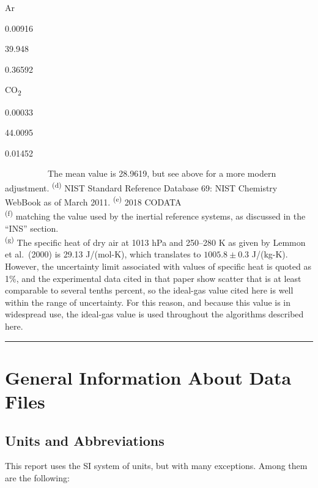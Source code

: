 \documentclass[
]{book}
\begin{document}
Ar

0.00916

39.948

0.36592

CO\textsubscript{2}

0.00033

44.0095

0.01452

~~~~~~~~~~The mean value is 28.9619, but see above for a more modern adjustment.
\textsuperscript{(d)} NIST Standard Reference Database 69: NIST Chemistry WebBook as of
March 2011.
\textsuperscript{(e)} 2018 CODATA\\
\textsuperscript{(f)} matching the value used by the inertial reference systems, as discussed
in the ``INS'' section.\\
\textsuperscript{(g)} The specific heat of dry air at 1013 hPa and 250--280 K as given
by Lemmon et al.~(2000) is 29.13 J/(mol-K), which translates to \(1005.8\pm 0.3\)
J/(kg-K). However, the uncertainty limit associated with values of
specific heat is quoted as 1\%, and the experimental data cited in
that paper show scatter that is at least comparable to several tenths
percent, so the ideal-gas value cited here is well within the range
of uncertainty. For this reason, and because this value is in widespread
use, the ideal-gas value is used throughout the algorithms described
here.

\begin{center}\rule{0.5\linewidth}{0.5pt}\end{center}

\hypertarget{general-information-about-data-files}{%
\chapter{General Information About Data Files}\label{general-information-about-data-files}}

\hypertarget{units-and-abbreviations}{%
\section{Units and Abbreviations}\label{units-and-abbreviations}}

This report uses the SI system of units, but with many exceptions. Among them are the following:
\end{document}
